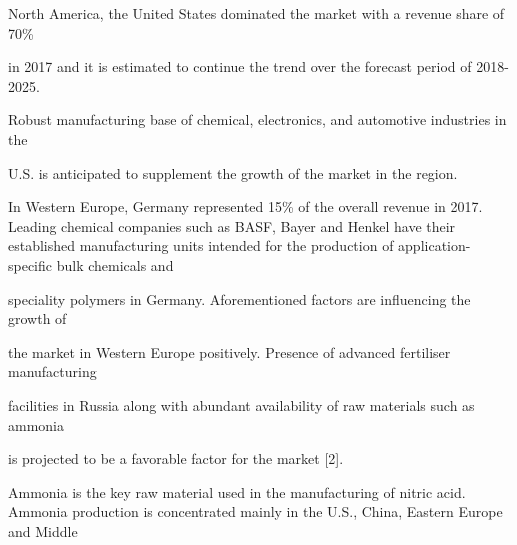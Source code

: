 \documentclass[a4paper,portrait,12pt]{article}
\begin{document}
\begin{flushleft}
North America, the United States dominated the market with a revenue share of 70\%
\end{flushleft}


\begin{flushleft}
in 2017 and it is estimated to continue the trend over the forecast period of 2018-2025.
\end{flushleft}


\begin{flushleft}
Robust manufacturing base of chemical, electronics, and automotive industries in the
\end{flushleft}


\begin{flushleft}
U.S. is anticipated to supplement the growth of the market in the region.
\end{flushleft}





\begin{flushleft}
In Western Europe, Germany represented 15\% of the overall revenue in 2017. Leading chemical companies such as BASF, Bayer and Henkel have their established manufacturing units intended for the production of application-specific bulk chemicals and
\end{flushleft}


\begin{flushleft}
speciality polymers in Germany. Aforementioned factors are influencing the growth of
\end{flushleft}


\begin{flushleft}
the market in Western Europe positively. Presence of advanced fertiliser manufacturing
\end{flushleft}


\begin{flushleft}
facilities in Russia along with abundant availability of raw materials such as ammonia
\end{flushleft}


\begin{flushleft}
is projected to be a favorable factor for the market [2].
\end{flushleft}





\begin{flushleft}
Ammonia is the key raw material used in the manufacturing of nitric acid. Ammonia production is concentrated mainly in the U.S., China, Eastern Europe and Middle
\end{flushleft}
\end{document}
